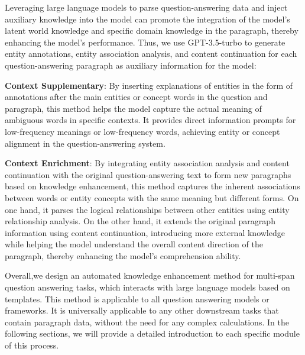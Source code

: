 Leveraging large language models to parse question-answering data and inject auxiliary knowledge into the model can promote the integration of the model's latent world knowledge and specific domain knowledge in the paragraph, thereby enhancing the model's performance. Thus, we use GPT-3.5-turbo to generate entity annotations, entity association analysis, and content continuation for each question-answering paragraph as auxiliary information for the model:

\textbf{Context Supplementary}: By inserting explanations of entities in the form of annotations after the main entities or concept words in the question and paragraph, this method helps the model capture the actual meaning of ambiguous words in specific contexts. It provides direct information prompts for low-frequency meanings or low-frequency words, achieving entity or concept alignment in the question-answering system.

\textbf{Context Enrichment}: By integrating entity association analysis and content continuation with the original question-answering text to form new paragraphs based on knowledge enhancement, this method captures the inherent associations between words or entity concepts with the same meaning but different forms. On one hand, it parses the logical relationships between other entities using entity relationship analysis. On the other hand, it extends the original paragraph information using content continuation, introducing more external knowledge while helping the model understand the overall content direction of the paragraph, thereby enhancing the model's comprehension ability.


Overall,we design an automated knowledge enhancement method for multi-span question answering tasks, which interacts with large language models based on templates. This method is applicable to all question answering models or frameworks. It is universally applicable to any other downstream tasks that contain paragraph data, without the need for any complex calculations. In the following sections, we will provide a detailed introduction to each specific module of this process.

